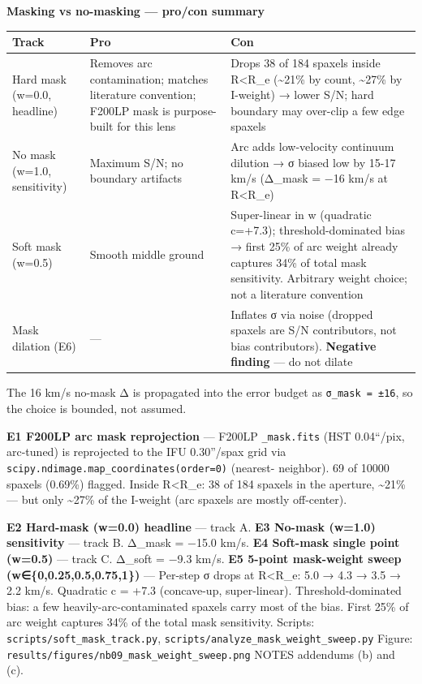 \documentclass[
  10pt,
]{article}
\begin{document}
\textbf{Masking vs no-masking --- pro/con summary}

\begingroup\small\setlength{\tabcolsep}{4pt}\begin{longtable}[]{@{}
  >{\raggedright\arraybackslash}p{}
  >{\raggedright\arraybackslash}p{}
  >{\raggedright\arraybackslash}p{}@{}}
\toprule
Track & Pro & Con \\
\midrule
\endhead
Hard mask (w=0.0, headline) & Removes arc contamination; matches literature convention; F200LP mask is purpose-built for this lens & Drops 38 of 184 spaxels inside R\textless R\_e (\textasciitilde21\%
by count, \textasciitilde27\% by I-weight) → lower S/N; hard boundary may over-clip a few edge spaxels \\
No mask (w=1.0, sensitivity) & Maximum S/N; no boundary artifacts & Arc adds low-velocity continuum dilution → σ biased low by 15-17 km/s (Δ\_mask = −16 km/s at R\textless R\_e) \\
Soft mask (w=0.5) & Smooth middle ground & Super-linear in w (quadratic c=+7.3); threshold-dominated bias → first 25\% of arc weight already captures 34\% of total mask sensitivity. Arbitrary weight
choice; not a literature convention \\
Mask dilation (E6) & --- & Inflates σ via noise (dropped spaxels are S/N contributors, not bias contributors). \textbf{Negative finding} --- do not dilate \\
\bottomrule
\end{longtable}\endgroup

The 16 km/s no-mask Δ is propagated into the error budget as \texttt{σ\_mask\ =\ ±16}, so the choice is bounded, not assumed.

\textbf{E1 F200LP arc mask reprojection} --- F200LP \texttt{\_mask.fits} (HST 0.04``/pix, arc-tuned) is reprojected to the IFU 0.30''/spax grid via \texttt{scipy.ndimage.map\_coordinates(order=0)}
(nearest- neighbor). 69 of 10000 spaxels (0.69\%) flagged. Inside R\textless R\_e: 38 of 184 spaxels in the aperture, \textasciitilde21\% --- but only \textasciitilde27\% of the I-weight (arc spaxels
are mostly off-center).

\textbf{E2 Hard-mask (w=0.0) headline} --- track A. \textbf{E3 No-mask (w=1.0) sensitivity} --- track B. Δ\_mask = −15.0 km/s. \textbf{E4 Soft-mask single point (w=0.5)} --- track C. Δ\_soft = −9.3
km/s. \textbf{E5 5-point mask-weight sweep (w∈\{0,0.25,0.5,0.75,1\})} --- Per-step σ drops at R\textless R\_e: 5.0 → 4.3 → 3.5 → 2.2 km/s. Quadratic c = +7.3 (concave-up, super-linear).
Threshold-dominated bias: a few heavily-arc-contaminated spaxels carry most of the bias. First 25\% of arc weight captures 34\% of the total mask sensitivity. Scripts:
\texttt{scripts/soft\_mask\_track.py}, \texttt{scripts/analyze\_mask\_weight\_sweep.py} Figure: \texttt{results/figures/nb09\_mask\_weight\_sweep.png} NOTES addendums (b) and (c).
\end{document}
